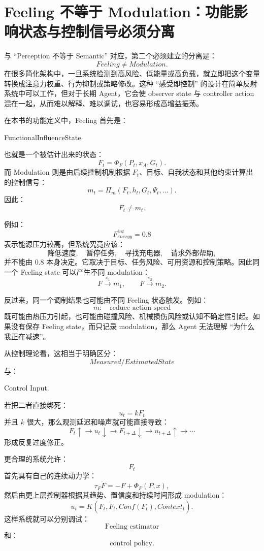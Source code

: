 \section{Feeling 不等于 Modulation：功能影响状态与控制信号必须分离}
\label{sec:feeling-not-modulation}

与 ``Perception 不等于 Semantic'' 对应，第二个必须建立的分离是：
\[
\boxed{
Feeling\neq Modulation.
}
\]
在很多简化架构中，一旦系统检测到高风险、低能量或高负载，就立即把这个变量转换成注意力权重、行为抑制或策略修改。这种 ``感受即控制'' 的设计在简单反射系统中可以工作，但对于长期 Agent，它会使 observer state 与 controller action 混在一起，从而难以解释、难以调试，也容易形成高增益振荡。

在本书的功能定义中，Feeling 首先是：
\begin{statementbox}
FunctionalInfluenceState.
\end{statementbox}
也就是一个被估计出来的状态：
\[
F_t
=
\Phi_F(P_t,x_A,G_t).
\]
而 Modulation 则是由后续控制机制根据 $F_t$、目标、自我状态和其他约束计算出的控制信号：
\[
m_t
=
\Pi_m(
F_t,
h_t,
G_t,
\Psi_t,\ldots
).
\]
因此：
\[
\boxed{
F_t
\neq
m_t.
}
\]

例如：
\[
F^{int}_{energy}=0.8
\]
表示能源压力较高，但系统究竟应该：
\[
\text{降低速度},
\quad
\text{暂停任务},
\quad
\text{寻找充电器},
\quad
\text{请求外部帮助},
\]
并不能由 $0.8$ 本身决定。它取决于目标、任务风险、可用资源和控制策略。因此同一个 Feeling state 可以产生不同 modulation：
\[
F
\overset{\pi_1}{\longrightarrow}
m_1,
\qquad
F
\overset{\pi_2}{\longrightarrow}
m_2.
\]

反过来，同一个调制结果也可能由不同 Feeling 状态触发。例如：
\[
m:
\quad
\text{reduce action speed}
\]
既可能由热压力引起，也可能由碰撞风险、机械损伤风险或认知不确定性引起。如果没有保存 Feeling state，而只记录 modulation，那么 Agent 无法理解 ``为什么我正在减速''。

从控制理论看，这相当于明确区分：
\[
\boxed{
Measured/Estimated State
}
\]
与：
\begin{statementbox}
Control Input.
\end{statementbox}
若把二者直接绑死：
\[
u_t=kF_t
\]
并且 $k$ 很大，那么观测延迟和噪声就可能直接导致：
\[
F_t\uparrow
\rightarrow
u_t\downarrow
\rightarrow
F_{t+\Delta}\downarrow
\rightarrow
u_{t+\Delta}\uparrow
\rightarrow\cdots
\]
形成反复过度修正。

更合理的系统允许：
\[
F_t
\]
首先具有自己的连续动力学：
\[
\tau_F\dot F
=
-F+\Phi_F(P,x),
\]
然后由更上层控制器根据其趋势、置信度和持续时间形成 modulation：
\[
u_t
=
K(
F_t,
\dot F_t,
Conf(F_t),
Context_t
).
\]
这样系统就可以分别调试：
\[
\text{Feeling estimator}
\]
和：
\[
\text{control policy}.
\]

